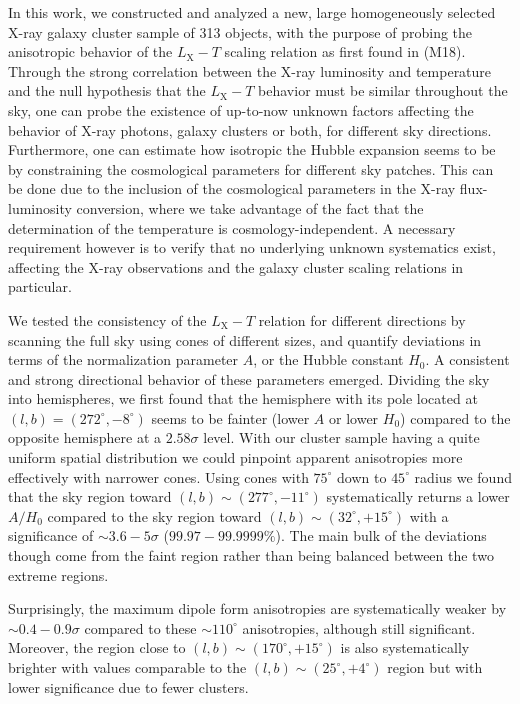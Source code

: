 \documentclass{aa}   %
\begin{document}
In this work, we constructed and analyzed a new, large homogeneously selected X-ray galaxy cluster sample of 313 objects, with the purpose of probing the anisotropic behavior of the $L_{\text{X}}-T$ scaling relation as first found in \citet{Migkas18} (M18). Through the strong correlation between the X-ray luminosity and temperature and the null hypothesis that the $L_{\text{X}}-T$ behavior must be similar throughout the sky, one can probe the existence of up-to-now unknown factors affecting the behavior of X-ray photons, galaxy clusters or both, for different sky directions. Furthermore, one can estimate how isotropic the Hubble expansion seems to be by constraining the cosmological parameters for different sky patches. This can be done due to the inclusion of the cosmological parameters in the X-ray flux-luminosity conversion, where we take advantage of the fact that the determination of the temperature is cosmology-independent. A necessary requirement however is to verify that no underlying unknown systematics exist, affecting the X-ray observations and the galaxy cluster scaling relations in particular. 

We tested the consistency of the $L_{\text{X}}-T$ relation for different directions by scanning the full sky using cones of different sizes, and quantify deviations in terms of the normalization parameter $A$, or the Hubble constant $H_0$. A consistent and strong directional behavior of these parameters emerged. Dividing the sky into hemispheres, we first found that the hemisphere with its pole located at $(l,b)=(272^{\circ}, -8^{\circ})$ seems to be fainter (lower $A$ or lower $H_0$) compared to the opposite hemisphere at a $2.58\sigma$ level. With our cluster sample having a quite uniform spatial distribution we could pinpoint apparent anisotropies more effectively with narrower cones. Using cones with $75^{\circ}$ down to $45^{\circ}$ radius we found that the sky region toward $(l,b)\sim (277^{\circ}, -11^{\circ})$ systematically returns a lower $A/H_0$ compared to the sky region toward $(l,b)\sim (32^{\circ}, +15^{\circ})$ with a significance of $\sim 3.6-5\sigma$ ($99.97-99.9999\%$). The main bulk of the deviations though come from the faint region rather than being balanced between the two extreme regions.

Surprisingly, the maximum dipole form anisotropies are systematically weaker by $\sim 0.4-0.9\sigma$ compared to these $\sim 110^{\circ}$ anisotropies, although still significant. Moreover, the region close to $(l,b)\sim (170^{\circ}, +15^{\circ})$ is also systematically brighter with values comparable to the $(l,b)\sim (25^{\circ}, +4^{\circ})$  region but with lower significance due to fewer clusters. 
\end{document}

